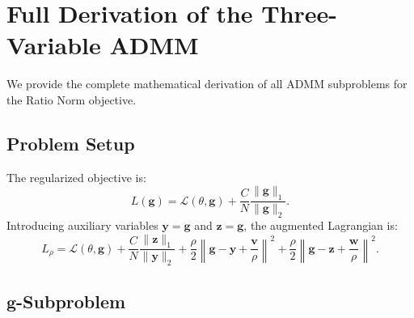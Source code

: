 \documentclass{uai2026} %
\theoremstyle{definition}
\theoremstyle{remark}
\newcommand{\bz}{\mathbf{z}}
\newcommand{\bg}{\mathbf{g}}
\newcommand{\bv}{\mathbf{v}}
\newcommand{\bw}{\mathbf{w}}
\newcommand{\by}{\mathbf{y}}
\begin{document}
\begin{table}[h]
    \centering
    \caption{Ring+XOR+Sum ($k{=}6$): Best-$k$ (\%) by Dimension.}\label{tab:rxs-dim}
\end{table}

\section{Full Derivation of the Three-Variable ADMM}\label{app:derivation}

We provide the complete mathematical derivation of all ADMM subproblems for the Ratio Norm objective.

\subsection{Problem Setup}

The regularized objective is:
\begin{equation}
    L(\bg) = \mathcal{L}(\theta,\bg) + \frac{C}{N}\frac{\lVert\bg\rVert_1}{\lVert\bg\rVert_2}.
\end{equation}
Introducing auxiliary variables $\by = \bg$ and $\bz = \bg$, the augmented Lagrangian is:
\begin{equation}
    L_\rho = \mathcal{L}(\theta,\bg) + \frac{C}{N}\frac{\lVert\bz\rVert_1}{\lVert\by\rVert_2}
    + \frac{\rho}{2}\left\lVert\bg - \by + \frac{\bv}{\rho}\right\rVert^2
    + \frac{\rho}{2}\left\lVert\bg - \bz + \frac{\bw}{\rho}\right\rVert^2.
\end{equation}

\subsection{$\bg$-Subproblem}
\end{document}
